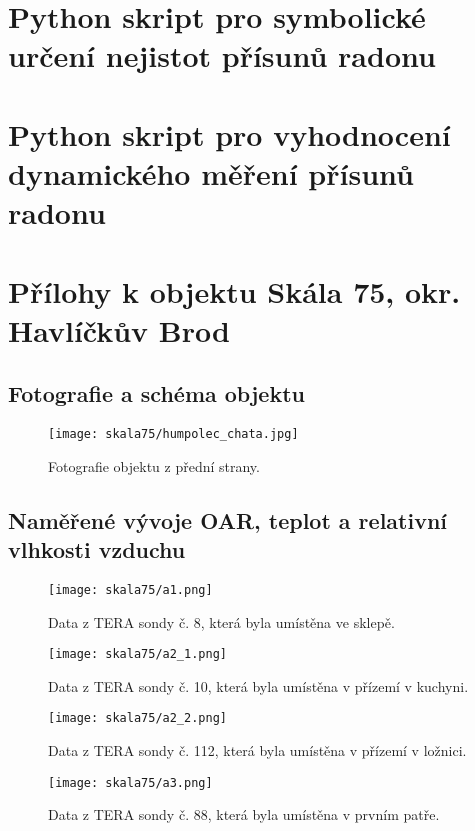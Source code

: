 \appendix
\chapter{Python skript pro symbolické určení nejistot přísunů radonu}\label{navesti:priloha_nejistoty}


\chapter{Python skript pro vyhodnocení dynamického měření přísunů radonu}\label{navesti:priloha_dynamickeMereni}


\chapter{Přílohy k objektu Skála 75, okr. Havlíčkův Brod}\label{navesti:priloha_skala75}

\section{Fotografie a schéma objektu}

\begin{figure}[H]
    \centering
    \texttt{[image: skala75/humpolec\_chata.jpg]}
    \caption{Fotografie objektu z přední strany.}
    \label{fig:skala75}
\end{figure}

\section{Naměřené vývoje OAR, teplot a relativní vlhkosti vzduchu}

\begin{figure}[H]
    \centering
    \texttt{[image: skala75/a1.png]}
    \caption{Data z TERA sondy č. 8, která byla umístěna ve sklepě.}
    \label{fig:skala75_a1}
\end{figure}
\begin{figure}[H]
    \centering
    \texttt{[image: skala75/a2\_1.png]}
    \caption{Data z TERA sondy č. 10, která byla umístěna v přízemí v kuchyni.}
    \label{fig:skala75_a2_1}
\end{figure}
\begin{figure}[H]
    \centering
    \texttt{[image: skala75/a2\_2.png]}
    \caption{Data z TERA sondy č. 112, která byla umístěna v přízemí v ložnici.}
    \label{fig:skala75_a2_2}
\end{figure}
\begin{figure}[H]
    \centering
    \texttt{[image: skala75/a3.png]}
    \caption{Data z TERA sondy č. 88, která byla umístěna v prvním patře.}
    \label{fig:skala75_a3}
\end{figure}

